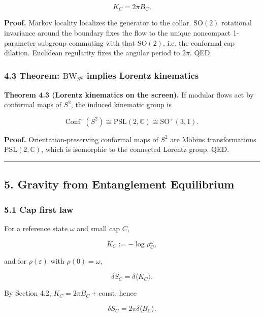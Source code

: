 \[
K_C = 2 \pi B_C.
\]

\textbf{Proof.} Markov locality localizes the generator to the collar. \(\mathrm{SO}(2)\) rotational invariance around the boundary fixes the flow to the unique noncompact 1-parameter subgroup commuting with that \(\mathrm{SO}(2)\), i.e. the conformal cap dilation. Euclidean regularity fixes the angular period to \(2\pi\). QED.

\subsubsection{\texorpdfstring{4.3 Theorem: \(\mathrm{BW}_{S^2}\) implies Lorentz kinematics}{4.3 Theorem: \textbackslash mathrm\{BW\}\_\{S\^{}2\} implies Lorentz kinematics}}\label{43-theorem-mathrmbw_s2-implies-lorentz-kinematics}

\textbf{Theorem 4.3 (Lorentz kinematics on the screen).} If modular flows act by conformal maps of \(S^2\), the induced kinematic group is

\[
\mathrm{Conf}^+(S^2) \cong \mathrm{PSL}(2,\mathbb C) \cong \mathrm{SO}^+(3,1).
\]

\textbf{Proof.} Orientation-preserving conformal maps of \(S^2\) are M\"{o}bius transformations \(\mathrm{PSL}(2,\mathbb{C})\), which is isomorphic to the connected Lorentz group. QED.

\begin{center}\rule{0.5\linewidth}{0.5pt}\end{center}

\subsection{5. Gravity from Entanglement Equilibrium}\label{5-gravity-from-entanglement-equilibrium}

\subsubsection{5.1 Cap first law}\label{51-cap-first-law}

For a reference state \(\omega\) and small cap \(C\),

\[
K_C := -\log \rho_C^{\omega},
\]

and for \(\rho(\varepsilon)\) with \(\rho(0)=\omega\),

\[
\delta S_C = \delta \langle K_C \rangle.
\]

By Section 4.2, \(K_C = 2\pi B_C + \text{const}\), hence

\[
\delta S_C = 2 \pi \delta \langle B_C \rangle.
\]

